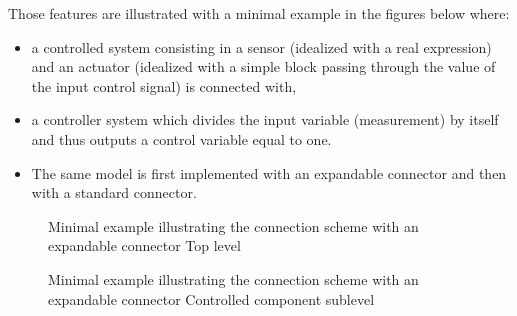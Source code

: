 \documentclass[letterpaper,10pt, openany,english]{sphinxmanual}
\begin{document}
Those features are illustrated with a minimal example in the figures below where:
\begin{itemize}
\item {} 
a controlled system consisting in a sensor (idealized with a real expression) and an actuator (idealized with a simple block passing through the value of the input control signal) is connected with,

\item {} 
a controller system which divides the input variable (measurement) by itself and thus outputs a control variable equal to one.

\item {} 
The same model is first implemented with an expandable connector and then with a standard connector.

\end{itemize}

\begin{figure}[htbp]
\centering
\capstart

\noindent{}
\caption{Minimal example illustrating the connection scheme with an expandable connector \textendash{} Top level}\label{\detokenize{requirements:bustestexp}}\end{figure}

\begin{sphinxVerbatim}[commandchars=\\\{\}]
 
 
 
       
 
\end{sphinxVerbatim}

\begin{figure}[htbp]
\centering
\capstart

\noindent{}
\caption{Minimal example illustrating the connection scheme with an expandable connector \textendash{} Controlled component sublevel}\label{\detokenize{requirements:bustestcontrolledexp}}\end{figure}
\end{document}
